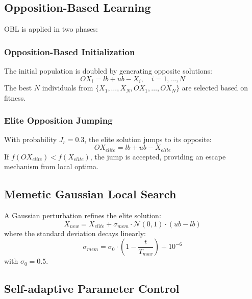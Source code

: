 \documentclass[preprint,12pt]{elsarticle}
\begin{document}
\subsection{Opposition-Based Learning}
\label{subsec:obl_component}

OBL is applied in two phases:

\subsubsection{Opposition-Based Initialization}
The initial population is doubled by generating opposite solutions:
\begin{equation}
OX_i = lb + ub - X_i, \quad i = 1, \ldots, N
\label{eq:obl_init}
\end{equation}
The best $N$ individuals from $\{X_1, \ldots, X_N, OX_1, \ldots, OX_N\}$ are selected based on fitness.

\subsubsection{Elite Opposition Jumping}
With probability $J_r = 0.3$, the elite solution jumps to its opposite:
\begin{equation}
OX_{elite} = lb + ub - X_{elite}
\label{eq:elite_jump}
\end{equation}
If $f(OX_{elite}) < f(X_{elite})$, the jump is accepted, providing an escape mechanism from local optima.

\subsection{Memetic Gaussian Local Search}
\label{subsec:memetic}

A Gaussian perturbation refines the elite solution:
\begin{equation}
X_{new} = X_{elite} + \sigma_{mem} \cdot \mathcal{N}(0,1) \cdot (ub - lb)
\label{eq:memetic}
\end{equation}
where the standard deviation decays linearly:
\begin{equation}
\sigma_{mem} = \sigma_0 \cdot \left(1 - \frac{t}{T_{max}}\right) + 10^{-6}
\label{eq:sigma_decay}
\end{equation}
with $\sigma_0 = 0.5$.

\subsection{Self-adaptive Parameter Control}
\label{subsec:selfadaptive}
\end{document}
